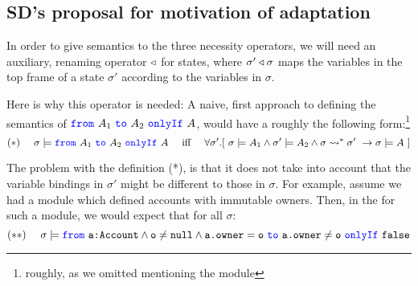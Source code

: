 
\subsection{SD's proposal for motivation of adaptation}

In order to give semantics to the three necessity operators, we will need an auxiliary, renaming operator 
$\triangleleft$ for states, where
 $\sigma' \triangleleft \sigma$ maps the variables in the top frame of a state $\sigma'$ according to the variables in 
 ${\sigma}$.

Here is why this operator is needed: A naive, first approach to defining the semantics of 
${\color{blue}\texttt{from}}\ A_1\ {\color{blue}\texttt{to}}\ A_2\ {\color{blue}\texttt{onlyIf}}\ A$, would have a roughly the following form:\footnote{roughly, as we omitted mentioning the module}  
\[ (*) \ \ \ \  \sigma \models \onlyIf{A_1}{A_2}{A}\ \ \ \ \mbox{iff} \ \ \ \ \forall \sigma'.[\ \sigma \models {A_1} \wedge \sigma' \models {A_2} \wedge \sigma \leadsto^* \sigma' \ \rightarrow  \sigma \models A \ ] \]

The problem with  the definition (*), is that it does not take into account that the variable bindings in $\sigma'$ might be different to those in $\sigma$. For example, assume  we had a module  which defined accounts with immutable owners. Then, in the for such a module, we would expect that for all $\sigma$:
\[ (**)\ \ \ \ \sigma \models {\color{blue}\texttt{from}}\ {\texttt{a:Account}} \wedge {\texttt{o}}\neq{\texttt{null}} \wedge {\texttt{a.owner}}={{\texttt{o}}}\ {\color{blue}\texttt{to}}\  {\texttt{a.owner}}\neq{{\texttt{o}}}\ {\color{blue}\texttt{onlyIf}}\ {\texttt{false}} \]

